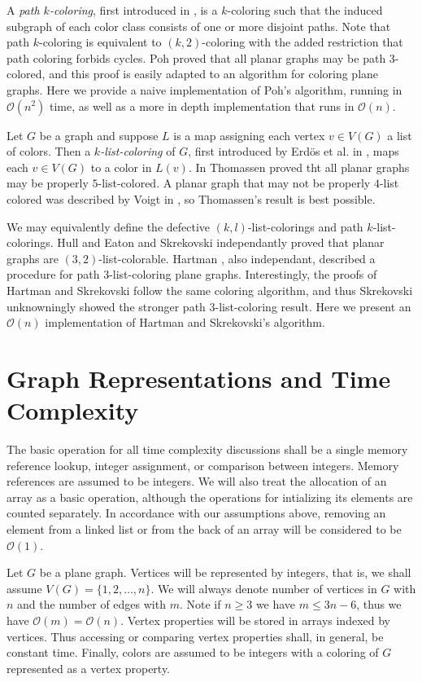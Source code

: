 \documentclass[letterpaper, 12pt]{amsart}
\theoremstyle{definition}
\theoremstyle{definition}
\theoremstyle{thm}
\theoremstyle{definition}
\begin{document}
A \textit{path $k$-coloring}, first introduced in \cite{harary}, is a
$k$-coloring such that the induced subgraph of each color class consists of one
or more disjoint paths. Note that path $k$-coloring is equivalent to
$(k,2)$-coloring with the added restriction that path coloring forbids cycles.
Poh \cite{poh} proved that all planar graphs may be path $3$-colored, and this
proof is easily adapted to an algorithm for coloring plane graphs. Here we
provide a naive implementation of Poh's algorithm, running in $\mathcal{O}(n^2)$
time, as well as a more in depth implementation that runs in $\mathcal{O}(n)$.

Let $G$ be a graph and suppose $L$ is a map assigning each vertex $v\in V(G)$ a
list of colors. Then a \textit{$k$-list-coloring} of $G$, first introduced
by Erd{\"o}s et al. in \cite{erdos}, maps each $v\in V(G)$ to a color in $L(v)$.
In \cite{thomassen} Thomassen proved tht all planar graphs may be properly
$5$-list-colored. A planar graph that may not be properly $4$-list colored was
described by Voigt in \cite{voigt}, so Thomassen's result is best possible.

We may equivalently define the defective $(k,l)$-list-colorings and path
$k$-list-colorings. Hull and Eaton \cite{hull} and Skrekovski \cite{skrekovski}
independantly proved that planar graphs are $(3,2)$-list-colorable. Hartman
\cite{hartman}, also independant, described a procedure for path
$3$-list-coloring plane graphs. Interestingly, the proofs of Hartman and
Skrekovski follow the same coloring algorithm, and thus Skrekovski
unknowningly showed the stronger path $3$-list-coloring result. Here we present
an $\mathcal{O}(n)$ implementation of Hartman and Skrekovski's algorithm.

\section{Graph Representations and Time Complexity}

The basic operation for all time complexity discussions shall be a single memory
reference lookup, integer assignment, or comparison between integers. Memory
references are assumed to be integers. We will also treat the allocation of an
array as a basic operation, although the operations for intializing its
elements are counted separately. In accordance with our assumptions above,
removing an element from a linked list or from the back of an array will be
considered to be $\mathcal{O}(1)$.

Let $G$ be a plane graph. Vertices will be represented by integers, that is, we
shall assume $V(G)=\{1,2,\ldots,n\}$. We will always denote
number of vertices in $G$ with $n$ and the number of edges with $m$. Note if
$n\ge 3$ we have $m\le 3n-6$, thus we have $\mathcal{O}(m)= \mathcal{O}(n)$.
Vertex properties will be stored in arrays indexed by vertices. Thus accessing
or comparing vertex properties shall, in general, be constant time. Finally,
colors are assumed to be integers with a coloring of $G$ represented as
a vertex property.
\end{document}
